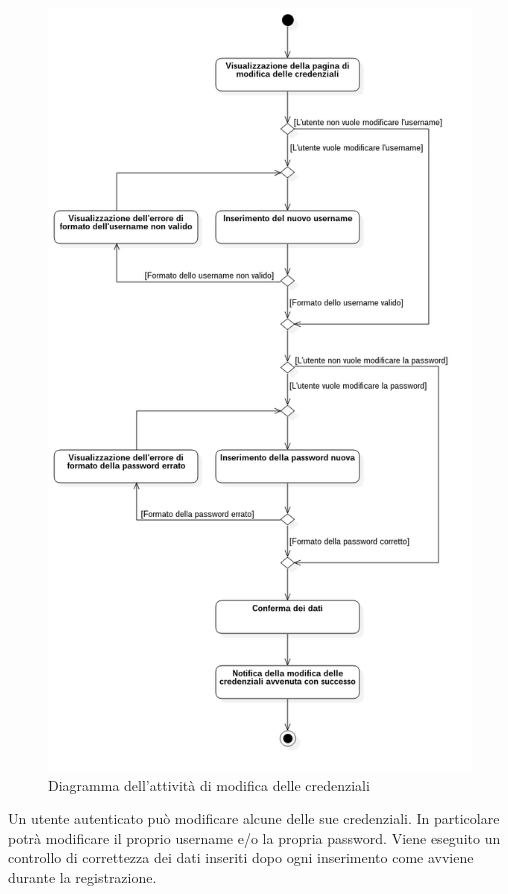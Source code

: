 \begin{figure}[!h]
	\centering
	\includegraphics[scale=0.5]{img/attivita/modifica_credenziali}  
	\caption{Diagramma dell'attività di modifica delle credenziali}
\end{figure}

Un utente autenticato può modificare alcune delle sue credenziali. In particolare potrà modificare il proprio username e/o la propria password.
Viene eseguito un controllo di correttezza dei dati inseriti dopo ogni inserimento come avviene durante la registrazione.

